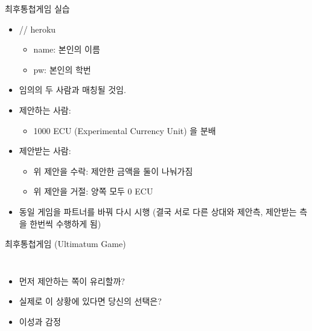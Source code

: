 \documentclass[final]{beamer}
\begin{document}
\begin{frame}[t]{최후통첩게임 실습}
	\begin{itemize}
		\item \url{} // heroku
		\begin{itemize}
			\item name: 본인의 이름
			\item pw: 본인의 학번
		\end{itemize}
		\item 임의의 두 사람과 매칭될 것임. 
		\item 제안하는 사람: 
		\begin{itemize}
			\item 1000 ECU (Experimental Currency Unit) 을 분배
		\end{itemize}
		\item 제안받는 사람:
		\begin{itemize}
			\item 위 제안을 수락: 제안한 금액을 둘이 나눠가짐
			\item 위 제안을 거절: 양쪽 모두 0 ECU
		\end{itemize}
		\item 동일 게임을 파트너를 바꿔 다시 시행 (결국 서로 다른 상대와 제안측, 제안받는 측을 한번씩 수행하게 됨)
	\end{itemize}
\end{frame}

\begin{frame}[t]{최후통첩게임 (Ultimatum Game)}
	\begin{columns}[c]
		\begin{itemize}
			\item 먼저 제안하는 쪽이 유리할까?
			\item 실제로 이 상황에 있다면 당신의 선택은?
			\item 이성과 감정 
		\end{itemize}
	\end{columns}
\end{frame}
\end{document}
